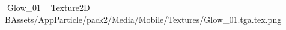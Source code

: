    Glow_01             	   Texture2D	   B   Assets/AppParticle/pack2/Media/Mobile/Textures/Glow_01.tga.tex.png